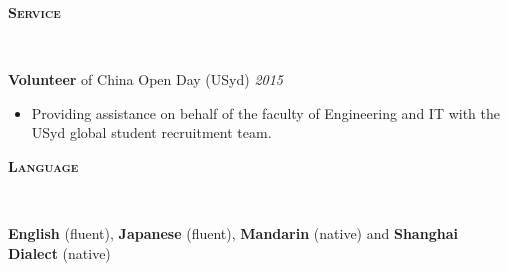 \documentclass[letterpaper, 10pt]{article}
\newenvironment{changemargin}[2]{%
  \begin{list}{}{%
      \setlength{\topsep}{0pt}%
      \setlength{\leftmargin}{#1}%
      \setlength{\rightmargin}{#2}%
      \setlength{\listparindent}{\parindent}%
      \setlength{\itemindent}{\parindent}%
      \setlength{\parsep}{\parskip}%
    }%
  \item[]}{\end{list}
}
\newcommand{\lineover}{
  \begin{changemargin}{-0.05in}{-0.05in}
    \vspace*{-8pt}
    \hrulefill \\
    \vspace*{-2pt}
  \end{changemargin}
}
\newcommand{\header}[1]{
  \begin{changemargin}{-0.5in}{-0.5in}
    \textbf{\scshape{#1}}\\
    \lineover
  \end{changemargin}
}
\newenvironment{body} {
  \vspace*{-16pt}
  \begin{changemargin}{-0.25in}{-0.5in}
  }
  {\end{changemargin}
}
\begin{document}
\header{Service}
\begin{body}
	\vspace{14pt}
	
	\textbf{Volunteer} of China Open Day (USyd) \hfill
	\emph{2015}
	\vspace{-2pt}
	\begin{itemize}
		\setlength{\itemindent}{0in}
		\setlength{\itemsep}{0in}
		\item Providing assistance on behalf of the faculty of Engineering and IT with the USyd global student recruitment team. 
	\end{itemize}
	
\end{body}
\smallskip
 \header{Language}

 \begin{body}
   \vspace{14pt}
   \textbf{English} (fluent), \textbf{Japanese} (fluent), \textbf{Mandarin} (native) and \textbf{Shanghai Dialect} (native) \\
 \end{body}
\end{document}
